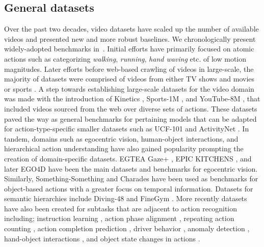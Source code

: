 \documentclass[smallextended,twocolumn,natbib]{svjour3}
\begin{document}
\subsection{General datasets}
\label{sec:datasets::general}
Over the past two decades, video datasets have scaled up the number of available videos and presented new and more robust baselines. We chronologically present widely-adopted benchmarks in~. Initial efforts \citep{schuldt2004recognizing,gorelick2007actions} have primarily focused on atomic actions such as categorizing \emph{walking}, \emph{running}, \emph{hand waving} etc. of low motion magnitudes. Later efforts before web-based crawling of videos in large-scale, the majority of datasets were comprised of videos from either TV shows and movies \citep{laptev2007retrieving,laptev2008learning,marszalek2009actions,patron2010high,kuehne2011hmdb} or sports \citep{rodriguez2008action,liu2009recognizing,reddy2013recognizing,niebles2010modeling}. A step towards establishing large-scale datasets for the video domain was made with the introduction of Kinetics \citep{carreira2017quo}, Sports-1M \citep{karpathy2014large}, and YouTube-8M \citep{abu2016youtube}, that included videos sourced from the web over diverse sets of actions. These datasets paved the way as general benchmarks for pertaining models that can be adapted for action-type-specific smaller datasets such as UCF-101 \citep{soomro2012ucf101} and ActivityNet \citep{caba2015activitynet}. In tandem, domains such as 
egocentric vision, human-object interactions, and hierarchical action understanding have also gained popularity prompting the creation of domain-specific datasets. EGTEA Gaze+ \citep{li2015delving}, EPIC KITCHENS \citep{damen2022rescaling}, and later EGO4D \citep{grauman2022ego4d} have been the main datasets and benchmarks for egocentric vision. Similarly, Something-Something \citep{goyal2017something} and Charades \citep{sigurdsson2016hollywood} have been used as benchmarks for object-based actions with a greater focus on temporal information. Datasets for semantic hierarchies include Diving-48 \citep{li2018resound} and FineGym \citep{shao2020finegym}. More recently datasets have also been created for subtasks that are adjacent to action recognition including; instruction learning \citep{alayrac2016unsupervised,bansal2022my,ben2021ikea,ohkawa2023assemblyhands,sener2022assembly101,tang2019coin}, action phase alignment \citep{sermanet2017unsupervised}, repeating action counting \citep{dwibedi2020counting,dwibedi2024ovr,hu2022transrac,runia2018real,zhang2020context}, action completion prediction \citep{epstein2020oops}, driver behavior \citep{martin2019drive,ortega2020dmd}, anomaly detection \citep{acsintoae2022ubnormal,liu2018future,lu2013abnormal,sultani2018real,wu2020not}, hand-object interactions \citep{chao2021dexycb,garcia2018first,hampali2020honnotate,kwon2021h2o,moon2020interhand2,mueller2017real}, and object state changes in actions \citep{souvcek2022look}.
\end{document}
